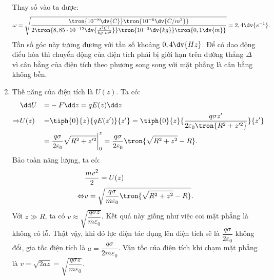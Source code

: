 \begin{loigiai}
\begin{enumerate}[1)]
\begin{equation}
            \end{equation}
            Thay số vào ta được:
            \begin{equation}
                \omega=\sqrt{\dfrac{\tron{10^{-8}\dv{C}}\tron{10^{-6}\dv{C/m^2}}}{2\tron{8,85\cdot10^{-12}\dv{\frac{s^2C^2}{kg\ m^3}}}\tron{10^{-3}\dv{kg}}\tron{0,1\dv{m}}}}=2,4\dv{s^{-1}}.
            \end{equation}
            Tần số góc này tương đương với tần số khoảng $0,4\dv{Hz}$. Để có dao động điểu hòa thì chuyển động của điện tích phải bị giới hạn trên đường thẳng $\Delta$ vì cân bằng của điện tích theo phương song song với mặt phẳng là cân bằng không bền.
            \item Thế năng của điện tích là $U(z)$. Ta có:
            \begin{equation}
            \begin{aligned}
                 &\dd U&=&-F\dd z=qE(z)\dd z\\
                 \Rightarrow &U(z)&=&\tiph{0}{z}{qE(z')}{z'}=\tiph{0}{z}{\dfrac{q\sigma z'}{2\varepsilon_0\tron{R^2+z'^2}}}{z'}\\
                 & \ &=&\left.\dfrac{q\sigma}{2\varepsilon_0}\sqrt{R^2+z'^2}\right|_0^z=\dfrac{q\sigma}{2\varepsilon_0}\tron{\sqrt{R^2+z^2}-R}.
            \end{aligned}
            \end{equation}
            Bảo toàn năng lượng, ta có:
            \begin{equation}
                \begin{aligned}
                   &\dfrac{mv^2}{2}=U(z)\\ \Leftrightarrow&v=\sqrt{\dfrac{q\sigma}{m\varepsilon_0}\tron{\sqrt{R^2+z^2}-R}}.
                \end{aligned}
            \end{equation}
            Với $z\gg R$, ta có $v\approx\sqrt{\dfrac{q\sigma z}{m\varepsilon_0}}$. Kết quả này giống như việc coi mặt phẳng là không có lỗ. Thật vậy, khi đó lực điện tác dụng lên điện tích sẽ là $\dfrac{q\sigma}{2\varepsilon_0}$ không đổi, gia tốc điện tích là $a=\dfrac{q\sigma}{2m\varepsilon_0}$. Vận tốc của điện tích khi chạm mặt phẳng là $v=\sqrt{2az}=\sqrt{\dfrac{q\sigma z}{m\varepsilon_0}}$.
        \end{enumerate}
    \end{loigiai}
    
